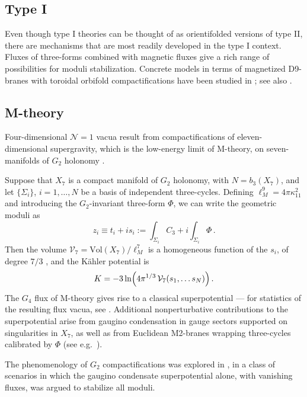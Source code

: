 \documentclass[12pt,a4wide]{article}
\def\V{\mathcal{V}}
\def\be{\begin{equation}}
\def\ee{\end{equation}}
\begin{document}
   
\subsection{Type I}
Even though type I theories can be thought of as orientifolded versions of type II, there are mechanisms that are most readily developed in the type I context. Fluxes of three-forms combined with magnetic fluxes give a rich range of possibilities for moduli stabilization. Concrete models in terms of magnetized 
D9-branes with toroidal orbifold compactifications have been studied in \cite{Antoniadis:2004pp,Antoniadis:2005nu}; see also \cite{Bianchi:2007fx}.

\subsection{M-theory}\label{ss:mth}

Four-dimensional $\mathcal{N}=1$ vacua result from
compactifications of eleven-dimensional supergravity, which is the low-energy limit of M-theory, on seven-manifolds of $G_2$ holonomy \cite{Duff:2002rw}.

Suppose that $X_7$ is a compact manifold of $G_2$ holonomy, with $N=b_3(X_7)$, and let $\{\Sigma_i\}$, $i=1,\ldots,N$ be a basis of independent three-cycles.
Defining $\ell_M^9 = 4\pi\kappa_{11}^2$ and introducing the $G_2$-invariant three-form $\Phi$, we can write the geometric moduli as \cite{Acharya:2005ez}
\begin{equation}
    z_i \equiv t_i + i s_i := \int_{\Sigma_i} C_3 + i \int_{\Sigma_i} \Phi\,.
\end{equation} 
Then the volume $\V_{7} = {\text{Vol}}(X_7)/\ell_M^7$ is a homogeneous function of the $s_i$, of degree $7/3$ \cite{Beasley:2002db}, and the K\"ahler potential is
\be
K=-3\ln\Bigl(4\pi^{1/3}\,\V_7(s_1,\ldots s_N)\Bigr)\,.
\ee
The $G_4$ flux of M-theory gives rise to a classical superpotential \cite{Gukov:1999gr,Beasley:2002db} --- for statistics of the resulting flux vacua, see \cite{Acharya:2005ez}.
Additional nonperturbative contributions to the superpotential arise from gaugino condensation in gauge sectors supported on singularities in $X_7$, as well as from Euclidean M2-branes wrapping three-cycles calibrated by $\Phi$ (see e.g.~\cite{Braun:2018fdp}).
 
The phenomenology of $G_2$ compactifications was explored in \cite{Acharya:2007rc,Acharya:2012tw}, in a class of scenarios in which the gaugino condensate superpotential alone, with vanishing fluxes, was argued to stabilize all moduli.
\end{document}
